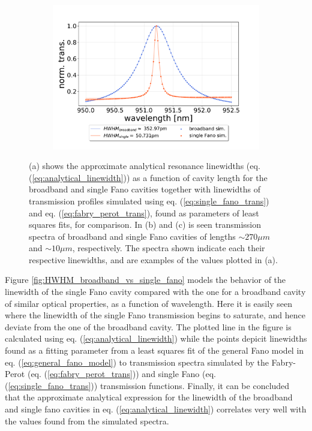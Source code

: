 \begin{figure}[h!]
\begin{subfigure}[c]{0.49\textwidth}
        \includegraphics[width=\textwidth]{figures/sim_single_vs_broadband_10um.pdf}
        \caption{}
        \label{fig:10um_broadband_and_single_fano_peak}
    \end{subfigure}
    \caption{(a) shows the approximate analytical resonance linewidths (eq. (\ref{eq:analytical_linewidth})) as a function of cavity length for the broadband and single Fano cavities together with linewidths of transmission profiles simulated using eq. (\ref{eq:single_fano_trans}) and eq. (\ref{eq:fabry_perot_trans}), found as parameters of least squares fits, for comparison. In (b) and (c) is seen transmission spectra of broadband and single Fano cavities of lengths $\sim 270 \mu m$ and $\sim 10 \mu m$, respectively. The spectra shown indicate each their respective linewidths, and are examples of the values plotted in (a).}
\end{figure}

Figure \ref{fig:HWHM_broadband_vs_single_fano} models the behavior of the linewidth of the single Fano cavity compared with the one for a broadband cavity of similar optical properties, as a function of wavelength. Here it is easily seen where the linewidth of the single Fano transmission begins to saturate, and hence deviate from the one of the broadband cavity. The plotted line in the figure is calculated using eq. (\ref{eq:analytical_linewidth}) while the points depicit linewidths found as a fitting parameter from a least squares fit of the general Fano model in eq. (\ref{eq:general_fano_model}) to transmission spectra simulated by the Fabry-Perot (eq. (\ref{eq:fabry_perot_trans})) and single Fano (eq. (\ref{eq:single_fano_trans})) transmission functions. Finally, it can be concluded that the approximate analytical expression for the linewidth of the broadband and single fano cavities in eq. (\ref{eq:analytical_linewidth}) correlates very well with the values found from the simulated spectra.

